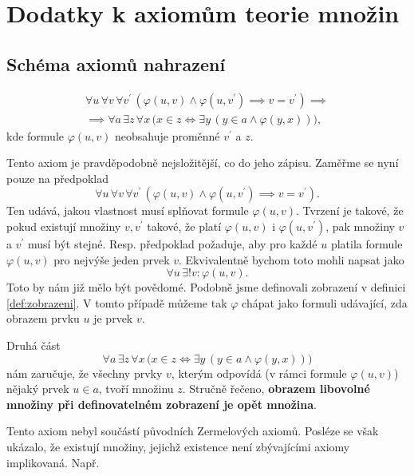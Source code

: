 \chapter{Dodatky k axiomům teorie množin}\label{chap:dodatky_k_axiomum_tm}
\section{Schéma axiomů nahrazení}\label{sec:schema_axiomu_nahrazeni}
\begin{align*}
    \forall u\,\forall v\,\forall v^\prime\,(\varphi(u,v) \land \varphi(u,v^\prime) \implies v=v^\prime)\implies\\ \implies \forall a\,\exists z\,\forall x\,\bigl(x\in z \iff \exists y\,(y\in a \land \varphi(y,x))\bigr),
\end{align*}
kde formule $\varphi(u,v)$ neobsahuje proměnné $v^\prime$ a $z$.\par
Tento axiom je pravděpodobně nejsložitější, co do jeho zápisu. Zaměřme se nyní pouze na předpoklad
\begin{equation*}
    \forall u\,\forall v\,\forall v^\prime\,(\varphi(u,v) \land \varphi(u,v^\prime) \implies v=v^\prime).
\end{equation*}
Ten udává, jakou vlastnost musí splňovat formule $\varphi(u,v)$. Tvrzení je takové, že pokud existují množiny $v,v^\prime$ takové, že platí $\varphi(u,v)$ i $\varphi(u,v^\prime)$, pak množiny $v$ a $v^\prime$ musí být stejné. Resp. předpoklad požaduje, aby pro každé $u$ platila formule $\varphi(u,v)$ pro nejvýše jeden prvek $v$. Ekvivalentně bychom toto mohli napsat jako
\begin{equation*}
    \forall u\,\exists! v: \varphi(u,v).
\end{equation*}
Toto by nám již mělo být povědomé. Podobně jsme definovali zobrazení v definici \ref{def:zobrazeni}. V tomto případě můžeme tak $\varphi$ chápat jako formuli udávající, zda obrazem prvku $u$ je prvek $v$.\par
Druhá část
\begin{equation*}
    \forall a\,\exists z\,\forall x\,\bigl(x\in z \iff \exists y\,(y\in a \land \varphi(y,x))\bigr)
\end{equation*}
nám zaručuje, že všechny prvky $v$, kterým odpovídá (v rámci formule $\varphi(u,v)$) nějaký prvek $u\in a$, tvoří množinu $z$. Stručně řečeno, \textbf{obrazem libovolné množiny při definovatelném zobrazení je opět množina}.\par
Tento axiom nebyl součástí původních Zermelových axiomů. Posléze se však ukázalo, že existují množiny, jejichž existence není zbývajícími axiomy implikovaná. Např.
